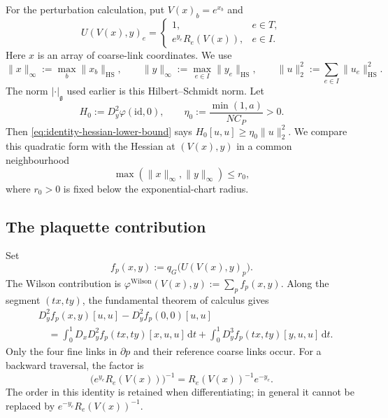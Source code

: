 \documentclass[10pt,reqno]{amsart}
\theoremstyle{definition}
\theoremstyle{remark}
\numberwithin{equation}{section}
\numberwithin{figure}{section}
\newcommand{\g}{\mathfrak g}
\newcommand{\dd}{\mathrm d}
\newcommand{\id}{\mathrm{id}}
\begin{document}
For the perturbation calculation, put $V(x)_b=e^{x_b}$ and
\begin{equation}\label{eq:near-identity-link-coordinates}
U(V(x),y)_e=\begin{cases}
1,&e\in T,\\
e^{y_e}R_e(V(x)),&e\in I.
\end{cases}
\end{equation}
Here $x$ is an array of coarse-link coordinates. We use
\begin{equation}\label{eq:link-array-norms}
\|x\|_\infty:=\max_b\|x_b\|_{\mathrm{HS}},\qquad
\|y\|_\infty:=\max_{e\in I}\|y_e\|_{\mathrm{HS}},\qquad
\|u\|_2^2:=\sum_{e\in I}\|u_e\|_{\mathrm{HS}}^2.
\end{equation}
The norm $|\cdot|_\g$ used earlier is this Hilbert--Schmidt norm.
Let
\begin{equation}\label{eq:flat-hessian-notation}
H_0:=D_y^2\varphi(\id,0),\qquad
\eta_0:=\frac{\min(1,a)}{NC_P}>0.
\end{equation}
Then \eqref{eq:identity-hessian-lower-bound} says
$H_0[u,u]\ge\eta_0\|u\|_2^2$. We compare this quadratic form with the
Hessian at $(V(x),y)$ in a common neighbourhood
\begin{equation}\label{eq:common-near-identity-radius}
\max(\|x\|_\infty,\|y\|_\infty)\le r_0,
\end{equation}
where $r_0>0$ is fixed below the exponential-chart radius.

\subsection{The plaquette contribution}
Set
\begin{equation}\label{eq:local-plaquette-function}
f_p(x,y):=q_G\bigl(U(V(x),y)_p\bigr).
\end{equation}
The Wilson contribution is $\varphi^{\mathrm{Wilson}}(V(x),y):=\sum_p f_p(x,y)$.
Along the segment $(tx,ty)$, the fundamental theorem of calculus gives
\begin{equation}\label{eq:local-hessian-segment-identity}
\begin{aligned}
&D_y^2f_p(x,y)[u,u]-D_y^2f_p(0,0)[u,u]\\
&\quad=\int_0^1D_xD_y^2f_p(tx,ty)[x,u,u]\,\dd t
+\int_0^1D_y^3f_p(tx,ty)[y,u,u]\,\dd t.
\end{aligned}
\end{equation}
Only the four fine links in $\partial p$ and their reference coarse links
occur. For a backward traversal, the factor is
\begin{equation}\label{eq:reversed-reference-factor}
\bigl(e^{y_e}R_e(V(x))\bigr)^{-1}
=R_e(V(x))^{-1}e^{-y_e}.
\end{equation}
The order in this identity is retained when differentiating; in general
it cannot be replaced by $e^{-y_e}R_e(V(x))^{-1}$.
\end{document}
